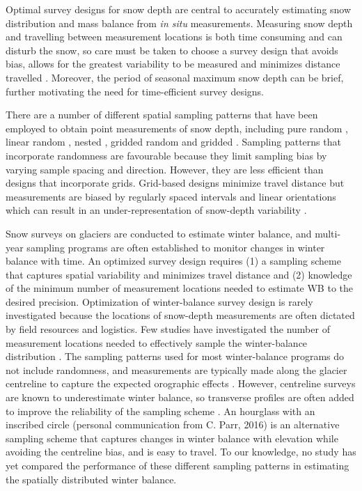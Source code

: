 \documentclass[twocolumn,letterpaper]{igs}
\begin{document}
Optimal survey designs for snow depth are central to accurately estimating snow distribution and mass balance from \textit{in situ} measurements. Measuring snow depth and travelling between measurement locations is both time consuming and can disturb the snow, so care must be taken to choose a survey design that avoids bias, allows for the greatest variability to be measured and minimizes distance travelled \citep[e.g.][]{Shea2010,Kinar2015}. Moreover, the period of seasonal maximum snow depth can be brief, further motivating the need for time-efficient survey designs. 


There are a number of different spatial sampling patterns that have been employed to obtain point measurements of snow depth, including pure random \citep[e.g.][]{Elder1991}, linear random \cite[e.g.][]{Shea2010}, nested \citep[e.g.][]{Schweizer2008}, gridded random \citep[e.g.][]{Bellaire2008, Elder2009, Bellaire2011} and gridded \citep[e.g.][]{Molotch2005a, Kronholm2007, Lopez2011}. Sampling patterns that incorporate randomness are favourable because they limit sampling bias by varying sample spacing and direction. However, they are less efficient than designs that incorporate grids. Grid-based designs minimize travel distance but measurements are biased by regularly spaced intervals and linear orientations which can result in an under-representation of  snow-depth variability \citep{Kronholm2007}.

Snow surveys on glaciers are conducted to estimate winter balance, and multi-year sampling programs are often established to monitor changes in winter balance with time. An optimized survey design requires (1) a sampling scheme that captures spatial variability and minimizes travel distance and (2) knowledge of the minimum number of measurement locations needed to estimate WB to the desired precision. 
Optimization of winter-balance survey design is rarely investigated because the locations of snow-depth measurements are often dictated by field resources and logistics. Few studies have investigated the number of measurement locations needed to effectively sample the winter-balance distribution \citep[c.f.][]{Fountain1999,Walmsley2015}. The sampling patterns used for most winter-balance programs do not include randomness, and measurements are typically made along the glacier centreline \citep[e.g.][]{Kaser2003} to capture the expected orographic effects \citep[e.g.][]{Grunewald2014}. However, centreline surveys are known to underestimate winter balance, so transverse profiles are often added to improve the reliability of the sampling scheme \citep[e.g.][]{Walmsley2015}. An hourglass with an inscribed circle (personal communication from C. Parr, 2016) is an alternative sampling scheme that captures changes in winter balance with elevation while avoiding the centreline bias, and is easy to travel. To our knowledge, no study has yet compared the performance of these different sampling patterns in estimating the spatially distributed winter balance.
\end{document}
